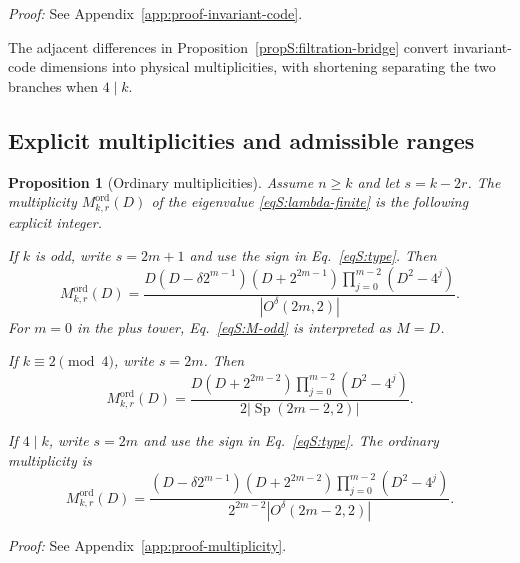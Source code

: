 \documentclass[journal,twocolumn]{IEEEtran}
\newtheorem{proposition}[theorem]{Proposition}
\theoremstyle{definition}
\theoremstyle{plain}
\newcommand{\Ord}{\mathrm{ord}}
\newcommand{\Sp}{\operatorname{Sp}}
\begin{document}
\noindent\emph{Proof:} See Appendix~\ref{app:proof-invariant-code}.\par

The adjacent differences in Proposition~\ref{propS:filtration-bridge}
convert invariant-code dimensions into physical multiplicities,
with shortening separating the two branches when $4\mid k$.

\subsection{Explicit multiplicities and admissible ranges}
\begin{proposition}[Ordinary multiplicities]
\label{propS:multiplicity}
Assume $n\geq k$ and let $s=k-2r$.  The multiplicity $M^{\Ord}_{k,r}(D)$ of the eigenvalue
\eqref{eqS:lambda-finite} is the following explicit integer.

If $k$ is odd, write $s=2m+1$ and use the sign in
Eq.~\eqref{eqS:type}.  Then
\begin{equation}
 M^{\Ord}_{k,r}(D)=
 \frac{D(D-\delta2^{m-1})(D+2^{2m-1})
 \prod_{j=0}^{m-2}(D^2-4^j)}{|O^\delta(2m,2)|}.
 \label{eqS:M-odd}
\end{equation}
For $m=0$ in the plus tower, Eq.~\eqref{eqS:M-odd} is interpreted as
$M=D$.

If $k\equiv2\pmod4$, write $s=2m$.  Then
\begin{equation}
 M^{\Ord}_{k,r}(D)=
 \frac{D(D+2^{2m-2})
 \prod_{j=0}^{m-2}(D^2-4^j)}
 {2|\Sp(2m-2,2)|}.
 \label{eqS:M-two}
\end{equation}

If $4\mid k$, write $s=2m$ and use the sign in
Eq.~\eqref{eqS:type}.  The ordinary multiplicity is
\begin{equation}
 M^{\Ord}_{k,r}(D)=
 \frac{(D-\delta2^{m-1})(D+2^{2m-2})
 \prod_{j=0}^{m-2}(D^2-4^j)}
 {2^{2m-2}|O^\delta(2m-2,2)|}.
 \label{eqS:M-zero}
\end{equation}
\end{proposition}

\noindent\emph{Proof:} See Appendix~\ref{app:proof-multiplicity}.\par
\end{document}
